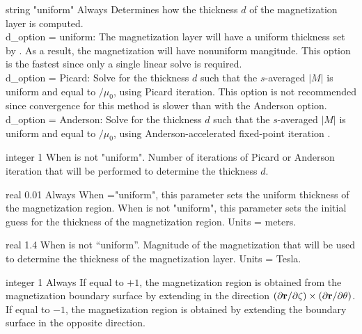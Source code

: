 {string}
{{\ttfamily "uniform"}}
{Always}
{Determines how the thickness $d$ of the magnetization layer is computed.\\

{\ttfamily d\_option} = {\ttfamily uniform}: The magnetization layer will have a uniform thickness set by . As a result, the 
magnetization will have nonuniform mangitude. This option is the fastest since only a single linear solve is required.\\

{\ttfamily d\_option} = {\ttfamily Picard}: Solve for the thickness $d$ such that the $s$-averaged $|M|$ is uniform and equal to $/\mu_0$,
 using Picard iteration. 
This option is not recommended since convergence for this method is slower than with the {\ttfamily Anderson} option.\\

{\ttfamily d\_option} = {\ttfamily Anderson}: Solve for the thickness $d$ such that the $s$-averaged $|M|$ is uniform and equal to $/\mu_0$, using Anderson-accelerated
fixed-point iteration \cite{Tonatiuh}.
}

\myhrule

{integer}
{1}
{When  is not "uniform".}
{Number of iterations of Picard or Anderson iteration that will be performed to determine the thickness $d$.}

\myhrule

{real}
{0.01}
{Always}
{When ={\ttfamily "uniform"}, this parameter sets the uniform thickness of the magnetization region.
When  is not {\ttfamily "uniform"}, this parameter sets the initial guess for the thickness of the magnetization region. Units = meters.}

\myhrule

{real}
{1.4}
{When  is not ``uniform''.}
{Magnitude of the magnetization that will be used to determine the thickness of the magnetization layer. Units = Tesla.}

\myhrule

{integer}
{1}
{Always}
{If equal to $+1$, the magnetization region is obtained from the magnetization boundary surface by extending in the direction 
$(\partial {\mathbf r}/\partial\zeta) \times (\partial {\mathbf r}/\partial\theta)$. If equal to $-1$, the magnetization region
is obtained by extending the boundary surface in the opposite direction.}


